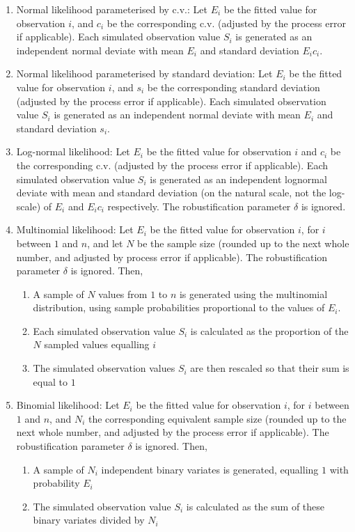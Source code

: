 \begin{enumerate}
  \item{} Normal likelihood parameterised by c.v.: Let $E_{i}$ be the fitted value for observation $i$, and $c_i$ be the corresponding c.v. (adjusted by the process error if applicable). Each simulated observation value $S_i$ is generated as an independent normal deviate with mean $E_i$ and standard deviation $E_i c_i$.
  \item{} Normal likelihood parameterised by standard deviation: Let $E_i$ be the fitted value for observation $i$, and $s_i$ be the corresponding standard deviation (adjusted by the process error if applicable). Each simulated observation value $S_i$ is generated as an independent normal deviate with mean $E_i$ and standard deviation $s_i$.
  \item{} Log-normal likelihood: Let $E_i$ be the fitted value for observation $i$ and $c_i$ be the corresponding c.v. (adjusted by the process error if applicable). Each simulated observation value $S_i$ is generated as an independent lognormal deviate with mean and standard deviation (on the natural scale, not the log-scale) of $E_i$ and $E_i c_i$ respectively. The robustification parameter $\delta$ is ignored.
  \item{} Multinomial likelihood: Let $E_i$ be the fitted value for observation $i$, for $i$ between $1$ and $n$, and let $N$ be the sample size (rounded up to the next whole number, and adjusted by process error if applicable). The robustification parameter $\delta$ is ignored. Then, 
  \begin{enumerate}
    \item{} A sample of $N$ values from $1$ to $n$ is generated using the multinomial distribution, using sample probabilities proportional to the values of $E_i$.
    \item{} Each simulated observation value $S_i$ is calculated as the proportion of the $N$ sampled values equalling $i$
    \item{} The simulated observation values $S_i$ are then rescaled so that their sum is equal to $1$
  \end{enumerate}
\item{} Binomial likelihood: Let $E_i$ be the fitted value for observation $i$, for $i$ between $1$ and $n$, and $N_i$ the corresponding equivalent sample size (rounded up to the next whole number, and adjusted by the process error if applicable). The robustification parameter $\delta$ is ignored. Then, 
  \begin{enumerate}
    \item{} A sample of $N_i$ independent binary variates is generated, equalling $1$ with probability $E_i$ 
    \item{}	The simulated observation value $S_i$ is calculated as the sum of these binary variates divided by $N_i$
  \end{enumerate}
\end{enumerate}
   
